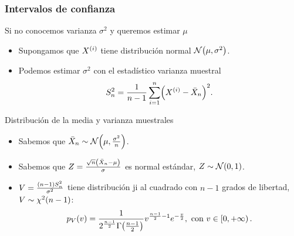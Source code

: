 \documentclass[table]{beamer}
\begin{document}
\begin{frame}
    \frametitle{Intervalos de confianza}
    \begin{block}{Si no conocemos varianza $\sigma^{2}$ y queremos estimar $\mu$}
        \begin{itemize}
            \item Supongamos que $X^{\parens{i}}$ tiene distribución normal $\normal{\mu}{\sigma^{2}}$.
            \item Podemos estimar $\sigma^{2}$ con el estadístico varianza muestral
                \begin{equation*}
                    S^{2}_{n} = \frac{1}{n - 1} \sum_{i = 1}^{n} \parens{X^{\parens{i}} - \bar{X}_{n}}^{2} .
                \end{equation*}
        \end{itemize}
    \end{block}
    \begin{block}{Distribución de la media y varianza muestrales}
        \begin{itemize}
            \item Sabemos que $\bar{X}_{n} \sim \normal{\mu}{\frac{\sigma^{2}}{n}}$.
            \item Sabemos que $Z = \frac{\sqrt{n} \parens{\bar{X}_{n} - \mu}}{\sigma}$ es normal estándar, $Z \sim \normal{0}{1}$.
            \item $V =  \frac{\parens{n - 1} S^{2}_{n}}{\sigma^{2}}$ tiene distribución ji al cuadrado con $n - 1$ grados de libertad, $V \sim \chidist{n - 1}$:
                \begin{equation*}
                    \ppdf{V}{v} = \frac{1}{2^{\frac{n - 1}{2}} \gammafunc{\frac{n - 1}{2}}} v^{\frac{n - 1}{2} - 1} e^{- \frac{v}{2}} ,
                    \text{ con } v \in \left [ 0 , + \infty \right ) .
                \end{equation*}
        \end{itemize}
    \end{block}
\end{frame}
\end{document}
